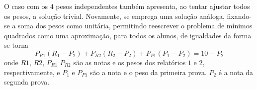 \documentclass[11pt]{article}
\begin{document}
		O caso com os $4$ pesos independentes também
                apresenta, ao tentar ajustar todos os pesos, a
                solução trivial. Novamente,
                se emprega uma solução análoga, fixando-se
                a soma dos pesos como unitária, permitindo
                reescrever o problema de mínimos quadrados como
                uma aproximação, para todos os alunos, de
                igualdades da forma
		\label{SISTEMA_PESOS_SIMPLES}
		se torna
		\begin{equation}
				P_{R1}(R_1 - P_2) +
				P_{R2}(R_2 - P_2) +
				P_{P1}(P_1 - P_2) = 10 - P_2
			\label{SISTEMA_PESOS_INDEPENDENTES}
		\end{equation}
		onde $R1$, $R2$, $P_{R1}$ $P_{R2}$ são as notas
		e os pesos dos relatórios $1$ e $2$,
		respectivamente, e $P_1$ e $P_{P1}$ são a nota
		e o peso da primeira prova. $P_2$ é a nota da
		segunda prova.

\end{document}
